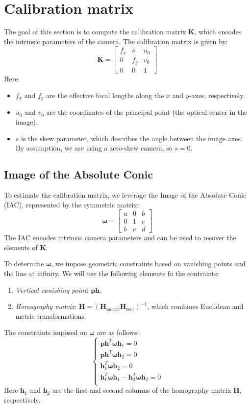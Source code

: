 \section{Calibration matrix}

The goal of this section is to compute the calibration matrix $\mathbf{K}$, which encodes the intrinsic parameters of the camera. 
The calibration matrix is given by:
\[\mathbf{K} = \begin{bmatrix} f_x & s & u_0 \\ 0 & f_y & v_0 \\ 0 & 0 & 1 \end{bmatrix}\]
Here: 
\begin{itemize}
    \item $f_x$ and $f_y$ are the effective focal lengths along the $x$ and $y$-axes, respectively.
    \item $u_0$ and $v_0$ are the coordinates of the principal point (the optical center in the image).
    \item $s$ is the skew parameter, which describes the angle between the image axes. 
        By assumption, we are using a zero-skew camera, so $s=0$. 
\end{itemize}

\subsection{Image of the Absolute Conic}
To estimate the calibration matrix, we leverage the Image of the Absolute Conic (IAC), represented by the symmetric matrix:
\[\boldsymbol{\omega} = \begin{bmatrix} a & 0 & b \\ 0 & 1 & c \\ b & c & d \end{bmatrix}\]
The IAC encodes intrinsic camera parameters and can be used to recover the elements of $\mathbf{K}$. 

To determine $\boldsymbol{\omega}$, we impose geometric constraints based on vanishing points and the line at infinity.
We will use the following elements fo the contraints: 
\begin{enumerate}
    \item \textit{Vertical vanishing point}: $\mathbf{ph}$.
    \item \textit{Homography matrix}: $\mathbf{H}=(\mathbf{H}_{\text{metric}}\mathbf{H}_{\text{rect}})^{-1}$, which combines Euclidean and metric transformations. 
\end{enumerate}
The constraints imposed on $\boldsymbol{\omega}$ are as follows: 
\[\begin{cases}
    \mathbf{ph}^T\boldsymbol{\omega}\mathbf{h}_1 = 0 \\
    \mathbf{ph}^T\boldsymbol{\omega}\mathbf{h}_2 = 0  \\
    \mathbf{h}_1^T \boldsymbol{\omega} \mathbf{h}_2 = 0 \\
    \mathbf{h}_1^T \boldsymbol{\omega} \mathbf{h}_1 - \mathbf{h}_2^T \boldsymbol{\omega} \mathbf{h}_2 = 0 \\
\end{cases}\]
Here $\mathbf{h}_1$ and $\mathbf{h}_2$ are the first and second columns of the homography matrix $\mathbf{H}$, respectively. 

